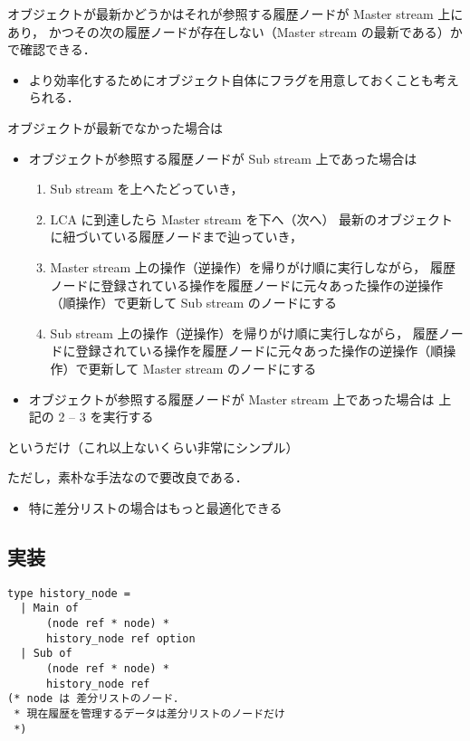 \documentclass[10pt, a4j, twocolumn]{scrartcl}
\begin{document}
オブジェクトが最新かどうかはそれが参照する履歴ノードが Master stream 上にあり，
かつその次の履歴ノードが存在しない（Master stream の最新である）かで確認できる．
\begin{itemize}
\item より効率化するためにオブジェクト自体にフラグを用意しておくことも考えられる．
\end{itemize}


オブジェクトが最新でなかった場合は
\begin{itemize}
\item オブジェクトが参照する履歴ノードが Sub stream 上であった場合は
\begin{enumerate}
\item Sub stream を上へたどっていき，
\item LCA に到達したら Master stream を下へ（次へ）
最新のオブジェクトに紐づいている履歴ノードまで辿っていき，
\item Master stream 上の操作（逆操作）を帰りがけ順に実行しながら，
履歴ノードに登録されている操作を履歴ノードに元々あった操作の逆操作（順操作）で更新して
Sub stream のノードにする
\item Sub stream 上の操作（逆操作）を帰りがけ順に実行しながら，
履歴ノードに登録されている操作を履歴ノードに元々あった操作の逆操作（順操作）で更新して
Master stream のノードにする
\end{enumerate}
\item オブジェクトが参照する履歴ノードが Master stream 上であった場合は
上記の 2 -- 3 を実行する
\end{itemize}


というだけ（これ以上ないくらい非常にシンプル）

ただし，素朴な手法なので要改良である．
\begin{itemize}
\item 特に差分リストの場合はもっと最適化できる
\end{itemize}


\subsection{実装}
\label{sec:org418a821}

\begin{lstlisting}
type history_node =
  | Main of
      (node ref * node) *
      history_node ref option
  | Sub of
      (node ref * node) *
      history_node ref
(* node は 差分リストのノード．
 * 現在履歴を管理するデータは差分リストのノードだけ
 *)
\end{lstlisting}
\end{document}
